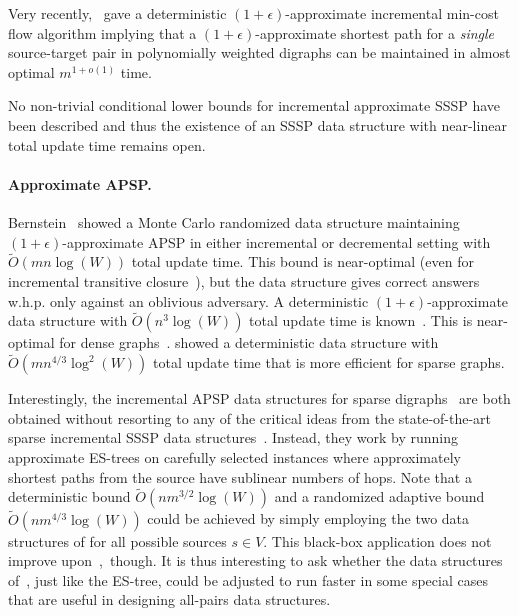 \documentclass[11pt,letterpaper]{article}
\theoremstyle{plain}
\renewcommand{\O}{O}
\newcommand{\Ot}{\ensuremath{\widetilde{\O}}}
\newcommand{\eps}{\ensuremath{\epsilon}}
\begin{document}
Very recently,~\cite{CKLMG24} gave a deterministic $(1+\eps)$-approximate incremental min-cost flow algorithm implying that a $(1+\eps)$-approximate shortest path for a \emph{single} source-target pair in polynomially weighted digraphs can be maintained in almost optimal $m^{1+o(1)}$ time.

No non-trivial conditional lower bounds for incremental approximate SSSP have been described and thus the existence of an SSSP data structure with near-linear total update time remains open.

\paragraph{Approximate APSP.} Bernstein~\cite{Bernstein16} showed a Monte Carlo randomized data structure maintaining $(1+\eps)$-approximate APSP in either incremental or decremental setting with $\Ot(mn\log(W))$ total update time.
This bound is near-optimal (even for incremental transitive closure~\cite{HenzingerKN15}), but the data structure gives correct answers w.h.p. only against an oblivious adversary.
A deterministic $(1+\eps)$-approximate data structure with $\Ot(n^3\log(W))$ total update time is known~\cite{KarczmarzL20}.
This is near-optimal for dense graphs~\cite{HenzingerKN15}. \cite{KarczmarzL19} showed a deterministic data structure with $\Ot(mn^{4/3}\log^2(W))$ total update time that is more efficient for sparse graphs.

Interestingly, the incremental APSP data structures for sparse digraphs~\cite{Bernstein16,KarczmarzL19} are both obtained without resorting to any of the critical ideas from the state-of-the-art sparse incremental SSSP data structures~\cite{KyngMG22}.
Instead, they work by running approximate ES-trees on carefully selected instances where approximately shortest paths from the source have sublinear numbers of hops.
Note that a deterministic bound $\Ot(nm^{3/2}\log(W))$ and a randomized adaptive bound $\Ot(nm^{4/3}\log(W))$ could be achieved by simply employing the two data structures of \cite{KyngMG22} for all possible sources $s\in V$.
This black-box application does not improve upon~\cite{KarczmarzL19},~though.
It is thus interesting to ask whether the data structures of~\cite{ChechikZ21,KyngMG22}, just like the ES-tree, could be adjusted to run faster in some special cases that are useful in designing all-pairs data structures.
\end{document}
